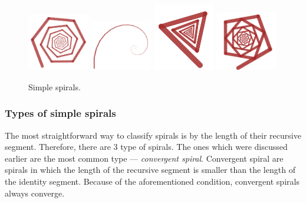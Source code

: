        \begin{figure}[ht]
            \caption{\label{spiral_simple_01} Simple spirals.}
            \centering
            \includegraphics[width=0.24\textwidth]{img/Simple_Techniques/Spirals/spiral_simple_01.png}
            \includegraphics[width=0.24\textwidth]{img/Simple_Techniques/Spirals/spiral_simple_02.png}
            \includegraphics[width=0.24\textwidth]{img/Simple_Techniques/Spirals/spiral_simple_04.png}
            \includegraphics[width=0.24\textwidth]{img/Simple_Techniques/Spirals/spiral_simple_05.png}
        \end{figure}


        \FloatBarrier

        \subsubsection{Types of simple spirals}

            The most straightforward way to classify spirals is by the length of their recursive segment.
            Therefore, there are 3 type of spirals.
            The ones which were discussed earlier are the most common type --- \emph{convergent spiral}.
            Convergent spiral are spirals in which the length of the recursive segment is smaller than the length of the identity segment.
            Because of the aforementioned condition, convergent spirals always converge.

